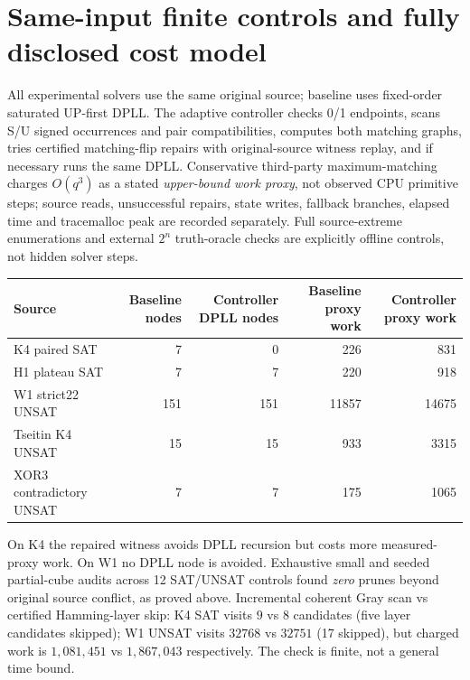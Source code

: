 \documentclass[10pt]{article}
\begin{document}
\section{Same-input finite controls and fully disclosed cost model}
All experimental solvers use the same original source; baseline uses fixed-order saturated UP-first DPLL. The adaptive controller checks 0/1 endpoints, scans S/U signed occurrences and pair compatibilities, computes both matching graphs, tries certified matching-flip repairs with original-source witness replay, and if necessary runs the same DPLL. Conservative third-party maximum-matching charges $O(q^3)$ as a stated \emph{upper-bound work proxy}, not observed CPU primitive steps; source reads, unsuccessful repairs, state writes, fallback branches, elapsed time and tracemalloc peak are recorded separately. Full source-extreme enumerations and external $2^n$ truth-oracle checks are explicitly offline controls, not hidden solver steps.
\begin{center}\begin{tabular}{lrrrr}
\toprule Source & Baseline nodes & Controller DPLL nodes & Baseline proxy work & Controller proxy work\\\midrule
K4 paired SAT &7&0&226&831\\
H1 plateau SAT &7&7&220&918\\
W1 strict22 UNSAT &151&151&11857&14675\\
Tseitin K4 UNSAT &15&15&933&3315\\
XOR3 contradictory UNSAT &7&7&175&1065\\\bottomrule
\end{tabular}\end{center}
On K4 the repaired witness avoids DPLL recursion but costs more measured-proxy work. On W1 no DPLL node is avoided. Exhaustive small and seeded partial-cube audits across 12 SAT/UNSAT controls found \emph{zero} prunes beyond original source conflict, as proved above. Incremental coherent Gray scan vs certified Hamming-layer skip: K4 SAT visits $9$ vs $8$ candidates (five layer candidates skipped); W1 UNSAT visits $32768$ vs $32751$ (17 skipped), but charged work is $1{,}081{,}451$ vs $1{,}867{,}043$ respectively. The check is finite, not a general time bound.
\end{document}
